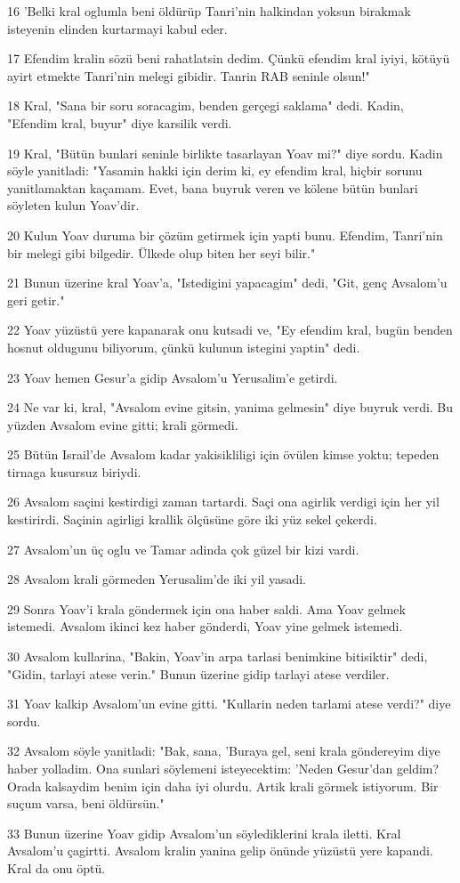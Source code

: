 \par 16 'Belki kral oglumla beni öldürüp Tanri'nin halkindan yoksun birakmak isteyenin elinden kurtarmayi kabul eder.
\par 17 Efendim kralin sözü beni rahatlatsin dedim. Çünkü efendim kral iyiyi, kötüyü ayirt etmekte Tanri'nin melegi gibidir. Tanrin RAB seninle olsun!"
\par 18 Kral, "Sana bir soru soracagim, benden gerçegi saklama" dedi. Kadin, "Efendim kral, buyur" diye karsilik verdi.
\par 19 Kral, "Bütün bunlari seninle birlikte tasarlayan Yoav mi?" diye sordu. Kadin söyle yanitladi: "Yasamin hakki için derim ki, ey efendim kral, hiçbir sorunu yanitlamaktan kaçamam. Evet, bana buyruk veren ve kölene bütün bunlari söyleten kulun Yoav'dir.
\par 20 Kulun Yoav duruma bir çözüm getirmek için yapti bunu. Efendim, Tanri'nin bir melegi gibi bilgedir. Ülkede olup biten her seyi bilir."
\par 21 Bunun üzerine kral Yoav'a, "Istedigini yapacagim" dedi, "Git, genç Avsalom'u geri getir."
\par 22 Yoav yüzüstü yere kapanarak onu kutsadi ve, "Ey efendim kral, bugün benden hosnut oldugunu biliyorum, çünkü kulunun istegini yaptin" dedi.
\par 23 Yoav hemen Gesur'a gidip Avsalom'u Yerusalim'e getirdi.
\par 24 Ne var ki, kral, "Avsalom evine gitsin, yanima gelmesin" diye buyruk verdi. Bu yüzden Avsalom evine gitti; krali görmedi.
\par 25 Bütün Israil'de Avsalom kadar yakisikliligi için övülen kimse yoktu; tepeden tirnaga kusursuz biriydi.
\par 26 Avsalom saçini kestirdigi zaman tartardi. Saçi ona agirlik verdigi için her yil kestirirdi. Saçinin agirligi krallik ölçüsüne göre iki yüz sekel çekerdi.
\par 27 Avsalom'un üç oglu ve Tamar adinda çok güzel bir kizi vardi.
\par 28 Avsalom krali görmeden Yerusalim'de iki yil yasadi.
\par 29 Sonra Yoav'i krala göndermek için ona haber saldi. Ama Yoav gelmek istemedi. Avsalom ikinci kez haber gönderdi, Yoav yine gelmek istemedi.
\par 30 Avsalom kullarina, "Bakin, Yoav'in arpa tarlasi benimkine bitisiktir" dedi, "Gidin, tarlayi atese verin." Bunun üzerine gidip tarlayi atese verdiler.
\par 31 Yoav kalkip Avsalom'un evine gitti. "Kullarin neden tarlami atese verdi?" diye sordu.
\par 32 Avsalom söyle yanitladi: "Bak, sana, 'Buraya gel, seni krala göndereyim diye haber yolladim. Ona sunlari söylemeni isteyecektim: 'Neden Gesur'dan geldim? Orada kalsaydim benim için daha iyi olurdu. Artik krali görmek istiyorum. Bir suçum varsa, beni öldürsün."
\par 33 Bunun üzerine Yoav gidip Avsalom'un söylediklerini krala iletti. Kral Avsalom'u çagirtti. Avsalom kralin yanina gelip önünde yüzüstü yere kapandi. Kral da onu öptü.

